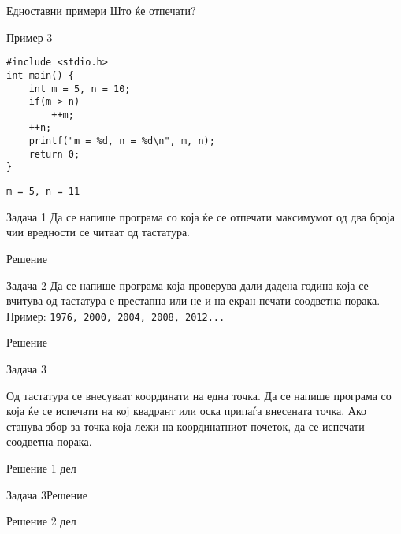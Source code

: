 \begin{frame}[fragile]{Едноставни примери}
Што ќе отпечати?
\begin{exampleblock}{Пример 3}
	\begin{lstlisting}
#include <stdio.h>
int main() {
    int m = 5, n = 10;
    if(m > n)
        ++m;
    ++n;
    printf("m = %d, n = %d\n", m, n);
    return 0;
} 
\end{lstlisting}
\end{exampleblock}
\pause
\vfill
\texttt{m = 5, n = 11}
\end{frame}


\begin{frame}[fragile]{Задача 1}
Да се напише програма со која ќе се отпечати максимумот од два броја чии вредности се читаат од тастатура.
\pause 
	\begin{exampleblock}{Решение}
	
	\end{exampleblock}

\end{frame}

\begin{frame}[fragile]{Задача 2}
Да се напише програма која проверува дали дадена година која се вчитува од тастатура е престапна или не и на екран печати соодветна порака.\\
Пример: \texttt{1976, 2000, 2004, 2008, 2012...}
\pause
	\begin{exampleblock}{Решение}
	
	\end{exampleblock}
\end{frame}


\begin{frame}[fragile]{Задача 3}
\begin{scriptsize}
Од тастатура се внесуваат координати на една точка. Да се напише програма со која ќе се испечати на кој квадрант или оска припаѓа внесената точка. Ако станува збор за точка која лежи на координатниот почеток, да се испечати соодветна порака.
\end{scriptsize}
\pause
	\begin{exampleblock}{Решение 1 дел}
	
	\end{exampleblock}
\end{frame}



\begin{frame}[fragile]{Задача 3}{Решение}
	\begin{exampleblock}{Решение 2 дел}
	
	\end{exampleblock}
\end{frame}



